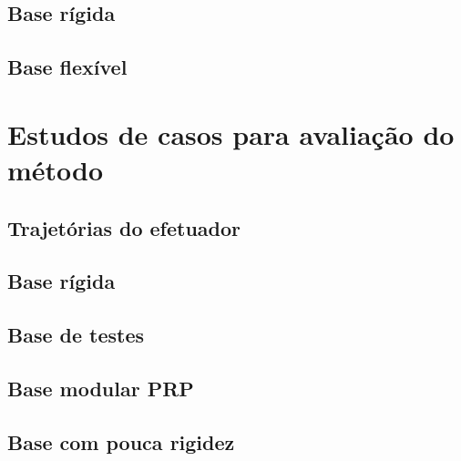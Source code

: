\subsection{Base rígida}

\subsection{Base flexível}


\section{Estudos de casos para avaliação do método}

\subsection{Trajetórias do efetuador}

\subsection{Base rígida}

\subsection{Base de testes}

\subsection{Base modular PRP}

\subsection{Base com pouca rigidez}
